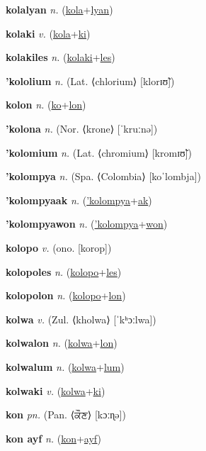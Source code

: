 \textbf{\hypertarget{kolalyan}{kolalyan}} \textit{n.} (\hyperlink{kola}{kola}+\allowbreak \hyperlink{lyan}{lyan})


\textbf{\hypertarget{kolaki}{kolaki}} \textit{v.} (\hyperlink{kola}{kola}+\allowbreak \hyperlink{ki}{ki})


\textbf{\hypertarget{kolakiles}{kolakiles}} \textit{n.} (\hyperlink{kolaki}{kolaki}+\allowbreak \hyperlink{les}{les})


\textbf{\hypertarget{'kololium}{'kololium}} \textit{n.} (Lat. ⟨chlorium⟩ [klorɪʊ̃])


\textbf{\hypertarget{kolon}{kolon}} \textit{n.} (\hyperlink{ko}{ko}+\allowbreak \hyperlink{lon}{lon})


\textbf{\hypertarget{'kolona}{'kolona}} \textit{n.} (Nor. ⟨krone⟩ [ˈkruːnə])


\textbf{\hypertarget{'kolomium}{'kolomium}} \textit{n.} (Lat. ⟨chromium⟩ [kromɪʊ̃])


\textbf{\hypertarget{'kolompya}{'kolompya}} \textit{n.} (Spa. ⟨Colombia⟩ [koˈlombja])


\textbf{\hypertarget{'kolompyaak}{'kolompyaak}} \textit{n.} (\hyperlink{'kolompya}{'kolompya}+\allowbreak \hyperlink{ak}{ak})


\textbf{\hypertarget{'kolompyawon}{'kolompyawon}} \textit{n.} (\hyperlink{'kolompya}{'kolompya}+\allowbreak \hyperlink{won}{won})


\textbf{\hypertarget{kolopo}{kolopo}} \textit{v.} (ono. [korop])


\textbf{\hypertarget{kolopoles}{kolopoles}} \textit{n.} (\hyperlink{kolopo}{kolopo}+\allowbreak \hyperlink{les}{les})


\textbf{\hypertarget{kolopolon}{kolopolon}} \textit{n.} (\hyperlink{kolopo}{kolopo}+\allowbreak \hyperlink{lon}{lon})


\textbf{\hypertarget{kolwa}{kolwa}} \textit{v.} (Zul. ⟨kholwa⟩ [ˈkʰɔːlwa])


\textbf{\hypertarget{kolwalon}{kolwalon}} \textit{n.} (\hyperlink{kolwa}{kolwa}+\allowbreak \hyperlink{lon}{lon})


\textbf{\hypertarget{kolwalum}{kolwalum}} \textit{n.} (\hyperlink{kolwa}{kolwa}+\allowbreak \hyperlink{lum}{lum})


\textbf{\hypertarget{kolwaki}{kolwaki}} \textit{v.} (\hyperlink{kolwa}{kolwa}+\allowbreak \hyperlink{ki}{ki})


\textbf{\hypertarget{kon}{kon}} \textit{pn.} (Pan. ⟨{\gurmukhi{}ਕੌਣ}⟩ [kɔːɳə])


\textbf{\hypertarget{kon ayf}{kon ayf}} \textit{n.} (\hyperlink{kon}{kon}+\allowbreak \hyperlink{ayf}{ayf})


